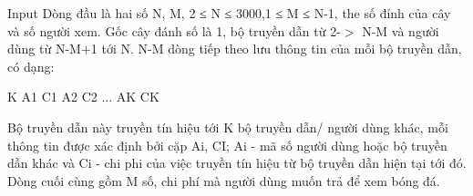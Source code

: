 Input
Dòng đầu là hai số N, M, 2 ≤ N ≤ 3000,1 ≤ M ≤ N-1, the số đỉnh của cây  và số người xem. Gốc cây đánh số là 1, bộ truyền dẫn từ 2-$>$ N-M và người dùng từ N-M+1 tới N.  N-M dòng tiếp theo lưu thông tin của mỗi bộ truyền dẫn, có dạng:  

   K A1 C1 A2 C2 ... AK CK  

   Bộ truyền dẫn này truyền tín hiệu tới K bộ truyền dẫn/ người dùng khác,  mỗi thông tin được xác định bởi cặp Ai, CI; Ai - mã số người dùng hoặc  bộ truyền dẫn khác và Ci - chi phi của việc truyền tín hiệu từ bộ truyền  dẫn hiện tại tới đó. Dòng cuối cùng gồm M số, chi phí mà người dùng muốn trả để xem bóng đá.